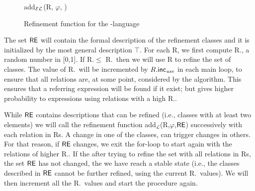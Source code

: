 \begin{figure}[t]
\small
\centering
\begin{algorithm}[H]
\dontprintsemicolon
\caption{add$_\mathcal{EL}$(R, $\varphi$, \RE)} \label{algo:bisim-add-el}

\end{algorithm}
\vspace*{-.5cm}\caption{Refinement function for the \el-language}\label{fig:algo2}
\end{figure}

The set $\textsf{RE}$ will contain the formal description of the refinement classes and it is initialized by the most general description $\top$.  
For each R, we first compute R.\randomuse, a random number in [0,1].  If R.\randomuse $\le$ R.\puse\ then we will use R to refine the set of classes.  The value of R.\puse\ will be incremented by $R.\textsf{inc}_\emph{use}$ in each main loop, to ensure that all relations are, at some point, considered by the algorithm.  This ensures that a referring expression will be found if it exist; but gives higher probability to expressions using relations with a high R.\puse. 
 
While $\textsf{RE}$ contains descriptions that can be refined (i.e., classes with at least two elements) we will call the refinement function add$_\mathcal{L}$(R,$\varphi$,$\textsf{RE}$) successively with each relation in Rs. A change in one of the classes, can trigger changes in others. For that reason, if $\textsf{RE}$ changes, we exit the for-loop to start again with the relations of higher R.\puse. If the after trying to refine the set with all relations in Rs, the set $\textsf{RE}$ has not changed, the we have reach a stable state (i.e., the classes described in $\textsf{RE}$ cannot be further refined, using the current R.\puse\ values). We will then increment all the R.\puse\ values and start the procedure again. 

